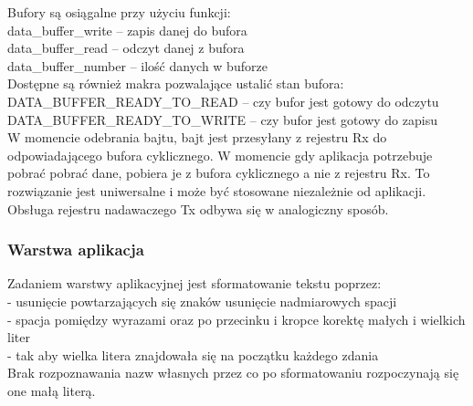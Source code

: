 \documentclass[a4paper,titlepage,11pt,floatssmall]{mwrep}
\begin{document}
Bufory są osiągalne przy użyciu funkcji:\\
	data\_{}buffer\_{}write – zapis danej do bufora\\
	data\_{}buffer\_{}read – odczyt danej z bufora\\
	data\_{}buffer\_{}number – ilość danych w buforze\\

Dostępne są również makra pozwalające ustalić stan bufora:\\
	DATA\_{}BUFFER\_{}READY\_{}TO\_{}READ – czy bufor jest gotowy do odczytu\\
	DATA\_{}BUFFER\_{}READY\_{}TO\_{}WRITE – czy bufor jest gotowy do zapisu\\

W momencie odebrania bajtu, bajt jest przesyłany z rejestru Rx do odpowiadającego bufora cyklicznego. W momencie gdy aplikacja potrzebuje pobrać pobrać dane, pobiera je z bufora cyklicznego a nie z rejestru Rx. To rozwiązanie jest uniwersalne i może być stosowane niezależnie od aplikacji. Obsługa rejestru nadawaczego Tx odbywa się w analogiczny sposób.

\subsubsection{Warstwa aplikacja}
Zadaniem warstwy aplikacyjnej jest sformatowanie tekstu poprzez: \\
	\indent{}- usunięcie powtarzających się znaków
usunięcie nadmiarowych spacji\\
	\indent{}- spacja pomiędzy wyrazami oraz po przecinku i kropce
 korektę małych i wielkich liter \\
\indent{}- tak aby wielka litera znajdowała się na początku każdego zdania\\
Brak rozpoznawania nazw własnych przez co po sformatowaniu rozpoczynają się one małą literą.\medskip
\end{document}
